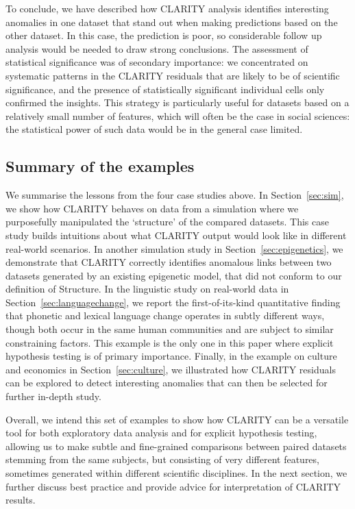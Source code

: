 \documentclass[a4]{article}
\newcommand{\+}[1]{\mathbf{#1}}
\begin{document}
To conclude, we have described how CLARITY analysis identifies interesting anomalies in one dataset that stand out when making predictions based on the other dataset. In this case, the prediction is poor, so  considerable follow up analysis would be needed to draw strong conclusions. The assessment of statistical significance was of secondary importance: we concentrated on systematic patterns in the CLARITY residuals that are likely to be of scientific significance, and the presence of statistically significant individual cells only confirmed the insights. This strategy is particularly useful for datasets based on a relatively small number of features, which will often be the case in social sciences: the statistical power of such data would be in the general case limited. 

\subsection{Summary of the examples}
\label{sec:summary-of-cases}

We summarise the lessons from the four case studies above. In Section~\ref{sec:sim}, we show how CLARITY behaves on data from a simulation where we purposefully manipulated the `structure' of the compared datasets. This case study builds intuitions about what CLARITY output would look like in different real-world scenarios. In another simulation study in Section~\ref{sec:epigenetics}, we demonstrate that CLARITY correctly identifies anomalous links between two datasets generated by an existing epigenetic model, that did not conform to our definition of Structure. In the linguistic study on real-world data in Section~\ref{sec:languagechange}, we report the first-of-its-kind quantitative finding that phonetic and lexical language change operates in subtly different ways, though both occur in the same human communities and are subject to similar constraining factors. This example is the only one  in this paper where explicit hypothesis testing is of primary importance. Finally, in the example on culture and economics in Section~\ref{sec:culture}, we illustrated how CLARITY residuals can be explored to detect interesting anomalies that can then be selected for further in-depth study. 

Overall, we intend this set of examples to show how CLARITY can be a versatile tool for both exploratory data analysis and for explicit hypothesis testing, allowing us to make subtle and fine-grained comparisons between paired datasets stemming from the same subjects, but consisting of very different features, sometimes generated within different scientific disciplines. In the next section, we further discuss best practice and provide advice for interpretation of CLARITY results. 
\end{document}
